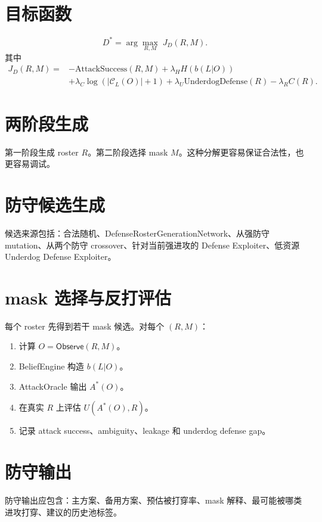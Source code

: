 \documentclass[UTF8,12pt,openany]{ctexbook}
\newcommand{\Ccal}{\mathcal{C}}
\newcommand{\Observe}{\mathsf{Observe}}
\begin{document}
\section{目标函数}
\begin{equation}
D^*=\arg\max_{R,M}\; J_D(R,M).
\end{equation}
其中
\begin{equation}
\begin{aligned}
J_D(R,M)=&-\mathrm{AttackSuccess}(R,M)+\lambda_H H(b(L|O))\\
&+\lambda_C\log(|\Ccal_L(O)|+1)
+\lambda_U \mathrm{UnderdogDefense}(R)-\lambda_R C(R).
\end{aligned}
\end{equation}

\section{两阶段生成}
第一阶段生成 roster $R$。第二阶段选择 mask $M$。这种分解更容易保证合法性，也更容易调试。

\section{防守候选生成}
候选来源包括：合法随机、DefenseRosterGenerationNetwork、从强防守 mutation、从两个防守 crossover、针对当前强进攻的 Defense Exploiter、低资源 Underdog Defense Exploiter。

\section{mask 选择与反打评估}
每个 roster 先得到若干 mask 候选。对每个 $(R,M)$：
\begin{enumerate}[leftmargin=2em]
\item 计算 $O=\Observe(R,M)$。
\item BeliefEngine 构造 $b(L|O)$。
\item AttackOracle 输出 $A^*(O)$。
\item 在真实 $R$ 上评估 $U(A^*(O),R)$。
\item 记录 attack success、ambiguity、leakage 和 underdog defense gap。
\end{enumerate}

\section{防守输出}
防守输出应包含：主方案、备用方案、预估被打穿率、mask 解释、最可能被哪类进攻打穿、建议的历史池标签。
\end{document}
